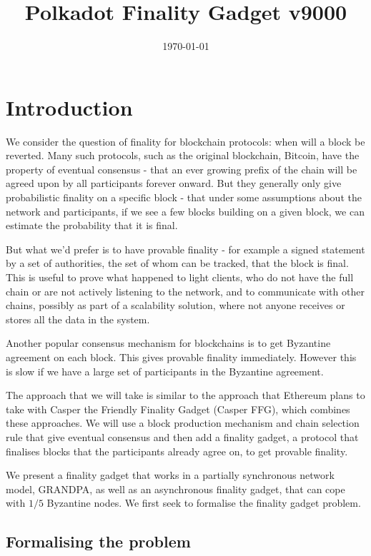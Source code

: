 \documentclass{article}
\begin{document}
\title{Polkadot Finality Gadget v9000}
\date{\today}
\maketitle

\section{Introduction}

We consider the question of finality for blockchain protocols: when will a block be reverted. Many such protocols, such as the original blockchain, Bitcoin, have the property of eventual consensus - that an ever growing prefix of the chain will be agreed upon by all participants forever onward.
But they generally only give probabilistic finality on a specific block - that under some assumptions about the network and participants, if we see a few blocks building on a given block, we can estimate the probability that it is final.

But what we'd prefer is to have provable finality - for example a signed statement by a set of authorities, the set of whom can be tracked, that the block is final.
This is useful to prove what happened to light clients, who do not have the full chain or are not actively listening to the network, and to communicate with other chains, possibly as part of a scalability solution, where not anyone receives or stores all the data in the system. 

Another popular consensus mechanism for blockchains is to get Byzantine agreement on each block.
This gives provable finality immediately. However this is slow if we have a large set of participants in the Byzantine agreement.

The approach that we will take is similar to the approach that Ethereum plans to take with Casper the Friendly Finality Gadget (Casper FFG)\cite{CasperFFG}, which combines these approaches.
We will use a block production mechanism and chain selection rule that give eventual consensus and then add a finality gadget, a protocol that finalises blocks that the participants already agree on, to get provable finality.

We present a finality gadget that works in a partially synchronous network model, GRANDPA, as well as an asynchronous finality gadget, that can cope with $1/5$ Byzantine nodes. We first seek to formalise the finality gadget problem.

\subsection{Formalising the problem}
\end{document}
